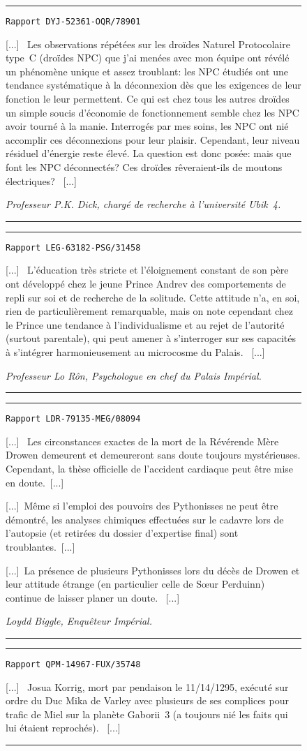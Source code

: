 \documentclass{article}
\newcommand{\indice}[3]{
    \begin{figure}[H]
        \begin{center}
            \rule{0.5\textwidth}{1pt}
        \end{center}
        \begin{framed}
            \begin{samepage}
                \texttt{Rapport #1}
                \nopagebreak

                [...]~#2~[...]

                \nopagebreak
                \hfill\textit{#3}
            \end{samepage}
        \end{framed}
        \caption{}
        \begin{center}
            \rule{0.5\textwidth}{1pt}
        \end{center}
    \end{figure}
}
\begin{document}
\indice
{DYJ-52361-OQR/78901}
{
    Les observations répétées sur les droïdes \og Naturel Protocolaire
    type~C\fg{} (droïdes NPC) que j'ai menées avec mon équipe ont révélé un
    phénomène unique et assez troublant: les NPC étudiés ont une tendance
    systématique à la déconnexion dès que les exigences de leur fonction le
    leur permettent. Ce qui est chez tous les autres droïdes un simple soucis
    d'économie de fonctionnement semble chez les NPC avoir tourné à la manie.
    Interrogés par mes soins, les NPC ont nié accomplir ces déconnexions pour
    leur plaisir. Cependant, leur niveau résiduel d'énergie reste élevé. La
    question est donc posée: mais que font les NPC déconnectés? Ces droïdes
    rêveraient-ils de moutons électriques?
}{Professeur P.K. Dick, chargé de recherche à l'université Ubik~4.}

\indice
{LEG-63182-PSG/31458}
{
    L'éducation très stricte et l'éloignement constant de son père ont
    développé chez le jeune Prince Andrev des comportements de repli sur soi et
    de recherche de la solitude. Cette attitude n'a, en soi, rien de
    particulièrement remarquable, mais on note cependant chez le Prince une
    tendance à l'individualisme et au rejet de l'autorité (surtout parentale),
    qui peut amener à s'interroger sur ses capacités à s'intégrer
    harmonieusement au microcosme du Palais.
}{Professeur Lo Rôn, Psychologue en chef du Palais Impérial.}

\indice
{LDR-79135-MEG/08094}
{
    Les circonstances exactes de la mort de la Révérende Mère Drowen
    demeurent et demeureront sans doute toujours mystérieuses. Cependant, la
    thèse officielle de l'accident cardiaque peut être mise en doute.~[...]

    \nobreak

    [...]~Même si l'emploi des pouvoirs des Pythonisses ne peut être démontré,
    les analyses chimiques effectuées sur le cadavre lors de l'autopsie (et
    retirées du dossier d'expertise final) sont troublantes.~[...]

    \nobreak

    [...]~La présence de plusieurs Pythonisses lors du décès de Drowen et leur
    attitude étrange (en particulier celle de Sœur Perduinn) continue de
    laisser planer un doute.
}{Loydd Biggle, Enquêteur Impérial.}

\indice
{QPM-14967-FUX/35748}
{
    Josua Korrig, mort par pendaison le 11/14/1295, exécuté sur ordre du Duc
    Mika de Varley avec plusieurs de ses complices pour trafic de Miel sur la
    planète Gaborii~3 (a toujours nié les faits qui lui étaient reprochés).
}{}
\end{document}
